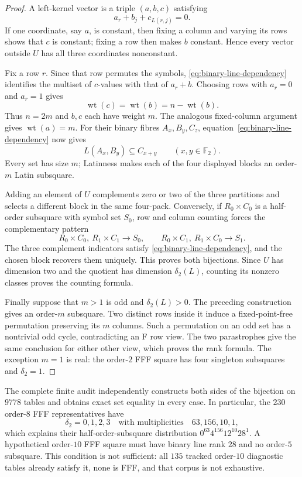 \begin{proof}
A left-kernel vector is a triple $(a,b,c)$ satisfying
\begin{equation}
 a_r+b_j+c_{L(r,j)}=0.\label{eq:binary-line-dependency}
\end{equation}
If one coordinate, say $a$, is constant, then fixing a
column and varying its rows shows that $c$ is constant; fixing a row then
makes $b$ constant.  Hence every vector outside $U$ has all three
coordinates nonconstant.

Fix a row $r$.  Since that row permutes the symbols,
\eqref{eq:binary-line-dependency} identifies the
multiset of $c$-values with that of $a_r+b$.  Choosing rows with $a_r=0$
and $a_r=1$ gives
\[
 \operatorname{wt}(c)=\operatorname{wt}(b)
 =n-\operatorname{wt}(b).
\]
Thus $n=2m$ and $b,c$ each have weight $m$.  The analogous fixed-column
argument gives $\operatorname{wt}(a)=m$.  For their binary fibres
$A_x,B_y,C_z$, equation~\eqref{eq:binary-line-dependency} now gives
\[
 L(A_x,B_y)\subseteq C_{x+y}\qquad(x,y\in\mathbb F_2).
\]
Every set has size $m$; Latinness makes each of the four displayed blocks an
order-$m$ Latin subsquare.

Adding an element of $U$ complements zero or two of the three partitions and
selects a different block in the same four-pack.  Conversely, if
$R_0\times C_0$ is a half-order subsquare with symbol set $S_0$, row and
column counting forces the complementary pattern
\[
 R_0\times C_0,\ R_1\times C_1\longrightarrow S_0,
 \qquad R_0\times C_1,\ R_1\times C_0\longrightarrow S_1.
\]
The three complement indicators satisfy
\eqref{eq:binary-line-dependency}, and the chosen block recovers
them uniquely.  This proves both bijections.  Since $U$ has dimension two
and the quotient has dimension $\delta_2(L)$, counting its nonzero classes
proves the counting formula.

Finally suppose that $m>1$ is odd and $\delta_2(L)>0$.  The preceding
construction gives an order-$m$ subsquare.  Two distinct rows inside it
induce a fixed-point-free permutation preserving its $m$ columns.  Such a
permutation on an odd set has a nontrivial odd cycle, contradicting an F row
view.  The two parastrophes give the same conclusion for either other view,
which proves the rank formula.  The exception $m=1$ is real: the order-$2$ FFF square has
four singleton subsquares and $\delta_2=1$.
\end{proof}

The complete finite audit independently constructs both sides of the
bijection on $9778$ tables and obtains exact set equality in every case.  In
particular, the $230$ order-$8$ FFF representatives have
\[
 \delta_2=0,1,2,3\quad\text{with multiplicities}\quad63,156,10,1,
\]
which explains their half-order-subsquare distribution
$0^{63}4^{156}12^{10}28^1$.  A hypothetical order-$10$ FFF square must have
binary line rank $28$ and no order-$5$ subsquare.  This condition is not
sufficient: all $135$ tracked order-$10$ diagnostic tables already satisfy
it, none is FFF, and that corpus is not exhaustive.

